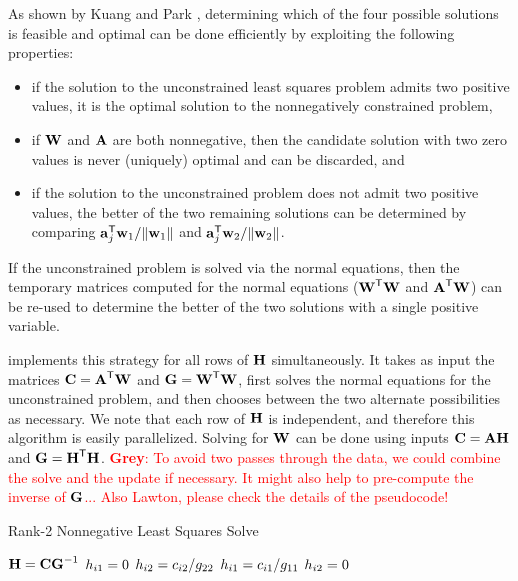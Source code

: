 \documentclass[conference,compsoc]{IEEEtran}
\newcommand{\GB}[1]{\textcolor{red}{\textbf{Grey}: #1}}
\begin{document}
As shown by Kuang and Park \cite{KP13}, determining which of the four possible solutions is feasible and optimal can be done efficiently by exploiting the following properties:
\begin{itemize}
	\item if the solution to the unconstrained least squares problem admits two positive values, it is the optimal solution to the nonnegatively constrained problem,
	\item if $\M{W}$ and $\M{A}$ are both nonnegative, then the candidate solution with two zero values is never (uniquely) optimal and can be discarded, and
	\item if the solution to the unconstrained problem does not admit two positive values, the better of the two remaining solutions can be determined by comparing $\V{a}_{j}^\Tra\V{w}_1 / \|\V{w}_1\|$ and $\V{a}_{j}^\Tra\V{w}_2 / \|\V{w}_2\|$.
\end{itemize}
If the unconstrained problem is solved via the normal equations, then the temporary matrices computed for the normal equations ($\M{W}^\Tra\M{W}$ and $\M{A}^\Tra\M{W}$) can be re-used to determine the better of the two solutions with a single positive variable.

 implements this strategy for all rows of $\M{H}$ simultaneously.
It takes as input the matrices $\M{C}=\M{A}^\Tra\M{W}$ and $\M{G}=\M{W}^\Tra\M{W}$, first solves the normal equations for the unconstrained problem, and then chooses between the two alternate possibilities as necessary.
We note that each row of $\M{H}$ is independent, and therefore this algorithm is easily parallelized.
Solving for $\M{W}$ can be done using inputs $\M{C}=\M{A}\M{H}$ and $\M{G}=\M{H}^\Tra\M{H}$.
\GB{To avoid two passes through the data, we could combine the solve and the update if necessary.  It might also help to pre-compute the inverse of $\M{G}$...  Also Lawton, please check the details of the pseudocode!}

\begin{algorithm}
\caption{Rank-2 Nonnegative Least Squares Solve \cite{KP13}}
\label{alg:r2nnls}
\begin{algorithmic}[1]
		\State $\M{H} = \M{C}\M{G}^{-1}$ \hfill {}
				\State {}
					\State $\ME{H}{i1} = 0$
					\State $\ME{H}{i2} = \ME{C}{i2} / \ME{G}{22}$
				\Else
					\State $\ME{H}{i1} = \ME{C}{i1} / \ME{G}{11}$
					\State $\ME{H}{i2} = 0$
				\EndIf
			\EndIf
		\EndFor
	\EndFunction
\end{algorithmic}
\end{algorithm}
\end{document}
